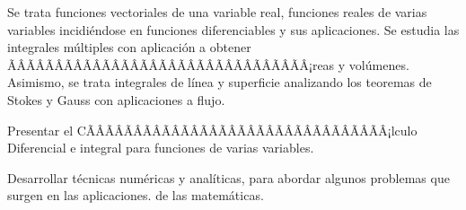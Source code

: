 \begin{sumilla}


\begin{fundamentacion}
Se trata funciones vectoriales de una variable real, funciones reales de varias variables incidi\'endose en funciones diferenciables y sus aplicaciones. Se estudia las integrales m\'ultiples con aplicaci\'on a obtener ÃÂÃÂÃÂÃÂÃÂÃÂÃÂÃÂÃÂÃÂÃÂÃÂÃÂÃÂÃÂÃÂ¡reas y vol\'umenes.
Asimismo, se trata integrales de l\'inea y superficie analizando los teoremas de Stokes y Gauss con aplicaciones a flujo.
\end{fundamentacion}

\begin{objetivosdelcurso}
\item  Presentar el CÃÂÃÂÃÂÃÂÃÂÃÂÃÂÃÂÃÂÃÂÃÂÃÂÃÂÃÂÃÂÃÂ¡lculo Diferencial e integral para funciones de varias variables.
\item  Desarrollar t\'ecnicas num\'ericas y anal\'iticas, para abordar algunos problemas que surgen en las aplicaciones. de las matem\'aticas.
\end{objetivosdelcurso}

\begin{outcomes}
\end{outcomes}


\end{sumilla}
